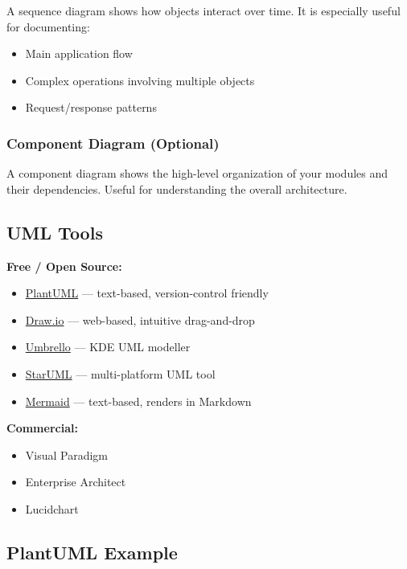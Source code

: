 A sequence diagram shows how objects interact over time. It is especially useful for documenting:

\begin{itemize}
  \item Main application flow
  \item Complex operations involving multiple objects
  \item Request/response patterns
\end{itemize}

\subsubsection{Component Diagram (Optional)}

A component diagram shows the high-level organization of your modules and their dependencies. Useful for understanding the overall architecture.

\subsection{UML Tools}

\textbf{Free / Open Source:}
\begin{itemize}
  \item \href{https://plantuml.com/}{PlantUML} --- text-based, version-control friendly
  \item \href{https://app.diagrams.net/}{Draw.io} --- web-based, intuitive drag-and-drop
  \item \href{https://umbrello.kde.org/}{Umbrello} --- KDE UML modeller
  \item \href{https://staruml.io/}{StarUML} --- multi-platform UML tool
  \item \href{https://mermaid.js.org/}{Mermaid} --- text-based, renders in Markdown
\end{itemize}

\textbf{Commercial:}
\begin{itemize}
  \item Visual Paradigm
  \item Enterprise Architect
  \item Lucidchart
\end{itemize}

\subsection{PlantUML Example}

